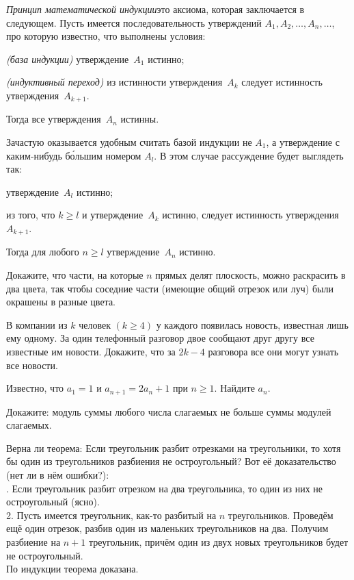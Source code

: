 \documentclass[a4paper,12pt]{article}
\begin{document}

\emph{Принцип математической индукции}\т это аксиома, которая заключается в следующем. Пусть имеется последовательность утверждений $A_1,A_2,\ldots,A_n,\ldots$, про которую известно, что выполнены условия:
\begin{nums}{-1}
\item\emph{(база индукции)} утверждение~$A_1$ истинно;
\item\emph{(индуктивный переход)} из истинности утверждения~$A_k$ следует истинность утверждения~$A_{k+1}$.
\end{nums}
\vspace{-2mm}
Тогда все утверждения~$A_n$ истинны.

Зачастую оказывается удобным считать базой индукции не $A_1$, а утверждение с каким-нибудь б\'ольшим номером $A_l$. В этом случае рассуждение будет выглядеть так:
\begin{nums}{-1}
\item утверждение~$A_l$ истинно;
\item из того, что $k \ge l$ и утверждение~$A_k$ истинно, следует истинность утверждения~$A_{k+1}$.
\end{nums}
\vspace{-2mm}
Тогда для любого $n \ge l$ утверждение~$A_n$ истинно.

Докажите, что части, на которые $n$ прямых делят плоскость, можно раскрасить в два цвета, так чтобы соседние части (имеющие общий отрезок или луч) были окрашены в разные цвета.

В компании из $k$ человек $(k\geq4)$ у каждого появилась новость, известная лишь ему одному. За один телефонный разговор двое сообщают друг другу все известные им новости. Докажите, что за $2k-4$ разговора все они могут узнать все новости.

Известно, что $a_1=1$ и  $a_{n+1}=2a_n+1$ при $n\geq1$. Найдите $a_n$.

Докажите: модуль суммы любого числа слагаемых не больше суммы модулей слагаемых.

Верна ли теорема:  Если треугольник разбит отрезками на треугольники, то хотя бы один из треугольников разбиения не остроугольный? Вот её доказательство (нет ли в нём ошибки?):\\
{. Если треугольник разбит отрезком на два треугольника, то один из них не остроугольный (ясно).\\
2. Пусть имеется треугольник, как-то разбитый на $n$ треугольников. Проведём ещё один отрезок, разбив один из маленьких треугольников на два. Получим разбиение на $n+1$ треугольник, причём один из двух новых треугольников будет не остроугольный.\\
По индукции теорема доказана.}
\end{document}
